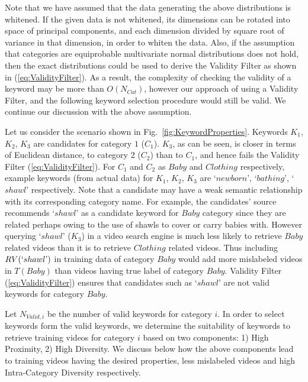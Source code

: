 Note that we have assumed that the data generating the above distributions is whitened. If the given data is not whitened, its dimensions can be rotated into space of principal components, and each dimension divided by square root of variance in that dimension, in order to whiten the data. Also, if the assumption that categories are equiprobable multivariate normal distributions does not hold, then the exact distributions could be used to derive the Validity Filter as shown in (\ref{eq:ValidityFilter}). As a result, the complexity of checking the validity of a keyword may be more than $O(N_{Cat})$, however our approach of using a Validity Filter, and the following keyword selection procedure would still be valid. We continue our discussion with the above assumption. 

Let us consider the scenario shown in Fig.~\ref{fig:KeywordProperties}. Keywords $K_1$, $K_2$, $K_3$ are candidates for category $1$ ($C_1$). $K_3$, as can be seen, is closer in terms of Euclidean distance, to category $2$ ($C_2$) than to $C_1$, and hence fails the Validity Filter (\ref{eq:ValidityFilter}). For $C_1$ and $C_2$ as $Baby$ and $Clothing$ respectively, example keywords (from actual data) for $K_1$, $K_2$, $K_3$ are `$newborn$', `$bathing$',  `$shawl$' respectively. Note that a candidate may have a weak semantic relationship with its corresponding category name. For example, the candidates' source \cite{ReverseDictionary} recommends `$shawl$' as a candidate keyword for $Baby$ category since they are related perhaps owing to the use of shawls to cover or carry babies with. 
However querying `$shawl$' ($K_3$) in a video search engine is much less likely to retrieve $Baby$ related videos than it is to retrieve $Clothing$ related videos. Thus including $RV(`shawl\text{'})$ in training data of category $Baby$ would add more mislabeled videos in $T(Baby)$ than videos having true label of category $Baby$. Validity Filter (\ref{eq:ValidityFilter}) ensures that candidates such as `$shawl$' are not valid keywords for category $Baby$. 

Let $N_{Valid,i}$ be the number of valid keywords for category $i$. In order to select keywords form the valid keywords, we determine the suitability of keywords to retrieve training videos for category $i$ based on two components: 1) High Proximity, 2) High Diversity. We discuss below how the above components lead to training videos having the desired properties, less mislabeled videos and high Intra-Category Diversity respectively.  


